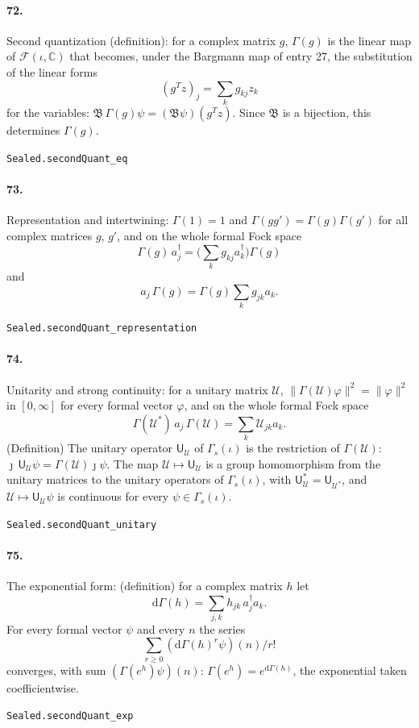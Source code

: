 \documentclass[11pt]{article}
\begin{document}
\paragraph{72.} Second quantization (definition): for a complex matrix $g$, $\Gamma(g)$ is the linear map of $\mathcal F(\iota, \mathbb C)$ that becomes, under the Bargmann map of entry 27, the substitution of the linear forms \[(g^T z)_j = \sum_k g_{kj} z_k\] for the variables: $\mathfrak B\, \Gamma(g)\psi = (\mathfrak B\psi)(g^T z)$. Since $\mathfrak B$ is a bijection, this determines $\Gamma(g)$.\par{\footnotesize\texttt{Sealed.secondQuant\_eq}}

\paragraph{73.} Representation and intertwining: $\Gamma(1) = 1$ and $\Gamma(g g') = \Gamma(g)\Gamma(g')$ for all complex matrices $g$, $g'$, and on the whole formal Fock space \[\Gamma(g)\, a_j^\dagger = \big(\sum_k g_{kj} a_k^\dagger\big)\Gamma(g)\] and \[a_j\, \Gamma(g) = \Gamma(g) \sum_k g_{jk} a_k.\]\par{\footnotesize\texttt{Sealed.secondQuant\_representation}}

\paragraph{74.} Unitarity and strong continuity: for a unitary matrix $\mathcal U$, $\|\Gamma(\mathcal U)\varphi\|^2 = \|\varphi\|^2$ in $[0, \infty]$ for every formal vector $\varphi$, and on the whole formal Fock space \[\Gamma(\mathcal U^*)\, a_j\, \Gamma(\mathcal U) = \sum_k \mathcal U_{jk} a_k.\] (Definition) The unitary operator $\mathsf U_{\mathcal U}$ of $\Gamma_s(\iota)$ is the restriction of $\Gamma(\mathcal U)$: $\jmath\, \mathsf U_{\mathcal U}\psi = \Gamma(\mathcal U)\jmath\psi$. The map $\mathcal U \mapsto \mathsf U_{\mathcal U}$ is a group homomorphism from the unitary matrices to the unitary operators of $\Gamma_s(\iota)$, with $\mathsf U_{\mathcal U}^* = \mathsf U_{\mathcal U^*}$, and $\mathcal U \mapsto \mathsf U_{\mathcal U}\psi$ is continuous for every $\psi \in \Gamma_s(\iota)$.\par{\footnotesize\texttt{Sealed.secondQuant\_unitary}}

\paragraph{75.} The exponential form: (definition) for a complex matrix $h$ let \[\mathrm d\Gamma(h) = \sum_{j, k} h_{jk}\, a_j^\dagger a_k.\] For every formal vector $\psi$ and every $n$ the series \[\sum_{r \ge 0} (\mathrm d\Gamma(h)^r\psi)(n)/r!\] converges, with sum $(\Gamma(e^h)\psi)(n)$: $\Gamma(e^h) = e^{\mathrm d\Gamma(h)}$, the exponential taken coefficientwise.\par{\footnotesize\texttt{Sealed.secondQuant\_exp}}
\end{document}
